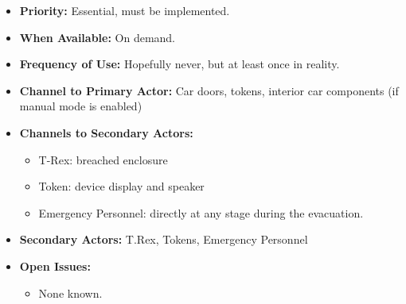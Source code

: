 \documentclass[12pt]{article}
\begin{document}
\begin{itemize}
        \item[]\textbf{Priority:}
            Essential, must be implemented.

        \item[]\textbf{When Available:}
            On demand.

        \item[]\textbf{Frequency of Use:}
            Hopefully never, but at least once in reality.

        \item[]\textbf{Channel to Primary Actor:}
            Car doors, tokens, interior car components (if manual mode is enabled)
            
        \item[]\textbf{Channels to Secondary Actors:}
            \begin{itemize}
                \item[] T-Rex: breached enclosure
                \item[] Token: device display and speaker
                \item[] Emergency Personnel: directly at any stage during the evacuation.
            \end{itemize}
        \item[]\textbf{Secondary Actors:}
            T.Rex, Tokens, Emergency Personnel

        \item[]\textbf{Open Issues:}
            \begin{itemize}
                \item[] None known.
            \end{itemize}
    \end{itemize}
\end{document}
